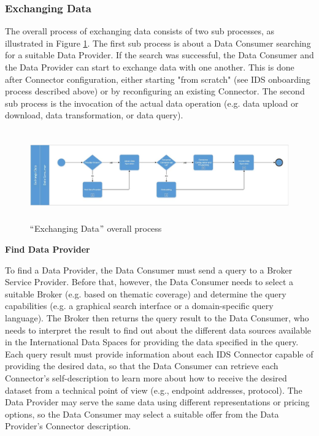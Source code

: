 \subsubsection{Exchanging Data}
The overall process of exchanging data consists of two sub processes, as illustrated in Figure \ref{fig:_Exchanging_Data__overall_process_}. The first sub process is about a Data Consumer searching for a suitable Data Provider. If the search was successful, the Data Consumer and the Data Provider can start to exchange data with one another. This is done after Connector configuration, either starting "from scratch" (see IDS onboarding process described above) or by reconfiguring an existing Connector. The second sub process is the invocation of the actual data operation (e.g. data upload or download, data transformation, or data query).


\begin{figure}[H]
	\begin{Center}
		\includegraphics[width=6.53in,height=1.53in]{./media/image26.jpeg}
		\caption{ $``$Exchanging Data$"$  overall process }
		\label{fig:_Exchanging_Data__overall_process_}
	\end{Center}
\end{figure}




\textbf{Find Data Provider}

To find a Data Provider, the Data Consumer must send a query to a Broker Service Provider. Before that, however, the Data Consumer needs to select a suitable Broker (e.g. based on thematic coverage) and determine the query capabilities (e.g. a graphical search interface or a domain-specific query language). The Broker then returns the query result to the Data Consumer, who needs to interpret the result to find out about the different data sources available in the International Data Spaces for providing the data specified in the query. Each query result must provide information about each IDS Connector capable of providing the desired data, so that the Data Consumer can retrieve each Connector's self-description to learn more about how to receive the desired dataset from a technical point of view (e.g., endpoint addresses, protocol). The Data Provider may serve the same data using different representations or pricing options, so the Data Consumer may select a suitable offer from the Data Provider's Connector description.

